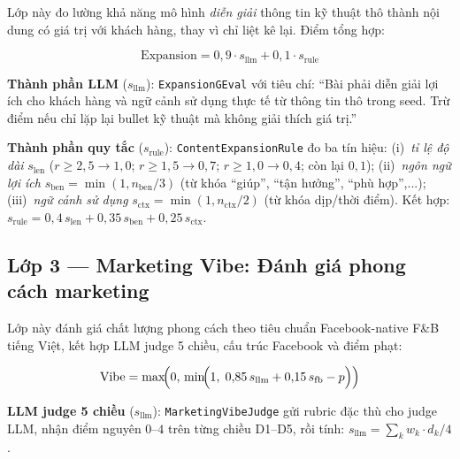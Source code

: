 Lớp này đo lường khả năng mô hình \emph{diễn giải} thông tin kỹ thuật
thô thành nội dung có giá trị với khách hàng, thay vì chỉ liệt kê lại.
Điểm tổng hợp:

\begin{equation}
  \text{Expansion} = 0{,}9 \cdot s_{\text{llm}} + 0{,}1 \cdot s_{\text{rule}}
  \label{eq:expansion}
\end{equation}

\textbf{Thành phần LLM} ($s_{\text{llm}}$): \texttt{ExpansionGEval}
với tiêu chí: ``Bài phải diễn giải lợi ích cho khách hàng và ngữ cảnh
sử dụng thực tế từ thông tin thô trong seed. Trừ điểm nếu chỉ lặp lại
bullet kỹ thuật mà không giải thích giá trị.''

\textbf{Thành phần quy tắc} ($s_{\text{rule}}$):
\texttt{ContentExpansionRule} đo ba tín hiệu:
(i)~\emph{tỉ lệ độ dài} $s_{\text{len}}$ ($r \geq 2{,}5 \to 1{,}0$;
$r \geq 1{,}5 \to 0{,}7$; $r \geq 1{,}0 \to 0{,}4$; còn lại $0{,}1$);
(ii)~\emph{ngôn ngữ lợi ích} $s_{\text{ben}} = \min(1, n_{\text{ben}}/3)$
(từ khóa ``giúp'', ``tận hưởng'', ``phù hợp'',...);
(iii)~\emph{ngữ cảnh sử dụng} $s_{\text{ctx}} = \min(1, n_{\text{ctx}}/2)$
(từ khóa dịp/thời điểm). Kết hợp:
$s_{\text{rule}} = 0{,}4\,s_{\text{len}} + 0{,}35\,s_{\text{ben}} +
0{,}25\,s_{\text{ctx}}$.

\subsection{Lớp 3 --- Marketing Vibe: Đánh giá phong cách marketing}
\label{subsec:vibe}

Lớp này đánh giá chất lượng phong cách theo tiêu chuẩn
Facebook-native F\&B tiếng Việt, kết hợp LLM judge 5 chiều,
cấu trúc Facebook và điểm phạt:

\begin{equation}
  \text{Vibe} = \max\!\Bigl(0,\,\min\!\Bigl(1,\;
  0{,}85\,s_{\text{llm}} + 0{,}15\,s_{\text{fb}} - p\Bigr)\Bigr)
  \label{eq:vibe}
\end{equation}

\textbf{LLM judge 5 chiều} ($s_{\text{llm}}$):
\texttt{MarketingVibeJudge} gửi rubric đặc thù cho judge LLM, nhận
điểm nguyên $0$--$4$ trên từng chiều D1--D5, rồi tính:
$s_{\text{llm}} = \sum_k w_k \cdot d_k / 4$.

